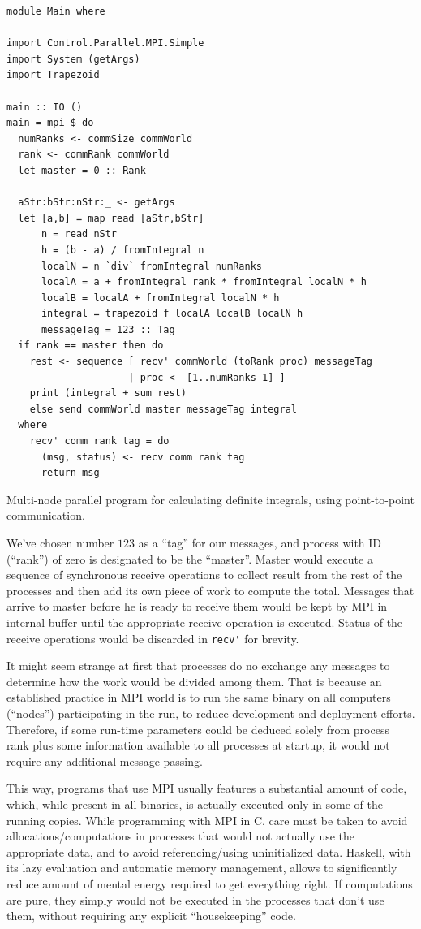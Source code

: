 \documentclass{tmr}
\begin{document}
\begin{listing}
\begin{Verbatim}
module Main where

import Control.Parallel.MPI.Simple
import System (getArgs)
import Trapezoid

main :: IO ()
main = mpi $ do
  numRanks <- commSize commWorld
  rank <- commRank commWorld
  let master = 0 :: Rank
      
  aStr:bStr:nStr:_ <- getArgs
  let [a,b] = map read [aStr,bStr]
      n = read nStr
      h = (b - a) / fromIntegral n
      localN = n `div` fromIntegral numRanks
      localA = a + fromIntegral rank * fromIntegral localN * h
      localB = localA + fromIntegral localN * h
      integral = trapezoid f localA localB localN h
      messageTag = 123 :: Tag
  if rank == master then do 
    rest <- sequence [ recv' commWorld (toRank proc) messageTag 
                     | proc <- [1..numRanks-1] ]
    print (integral + sum rest)
    else send commWorld master messageTag integral
  where
    recv' comm rank tag = do 
      (msg, status) <- recv comm rank tag
      return msg
\end{Verbatim}
\caption{Multi-node parallel program for calculating definite
  integrals, using point-to-point communication. \label{mpi-p2p}}
\end{listing}

We've chosen number $123$ as a ``tag'' for our messages, and process
with ID (``rank'') of zero is designated to be the ``master''. Master
would execute a sequence of synchronous receive operations to collect
result from the rest of the processes and then add its own piece of
work to compute the total. Messages that arrive to master before he is
ready to receive them would be kept by MPI in internal buffer until
the appropriate receive operation is executed. Status of the receive
operations would be discarded in \verb|recv'| for brevity.

It might seem strange at first that processes do no exchange any
messages to determine how the work would be divided among them. That is
because an established practice in MPI world is to run the same binary
on all computers (``nodes'') participating in the run, to reduce
development and deployment efforts. Therefore, if some run-time
parameters could be deduced solely from process rank plus
some information available to all processes at startup, it would not
require any additional message passing.

This way, programs that use MPI usually features a substantial amount of code,
which, while present in all binaries, is actually executed only in
some of the running copies. While programming with MPI in C, care must
be taken to avoid allocations/computations in processes that would not
actually use the appropriate data, and to avoid referencing/using
uninitialized data. Haskell, with its lazy evaluation and automatic
memory management, allows to significantly reduce amount of mental
energy required to get everything right. If computations are pure,
they simply would not be executed in the processes that don't use
them, without requiring any explicit ``housekeeping'' code.
\end{document}
